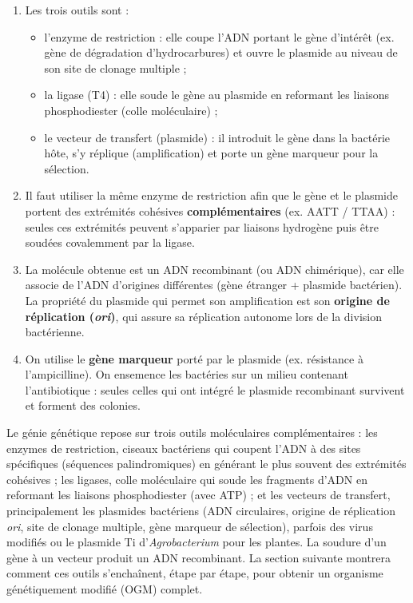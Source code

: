\documentclass[11pt]{article}
\newcommand{\cle}[1]{{\popxbold\color{popdark}#1}}
\begin{document}
\begin{corrige}[Exercice]
\begin{enumerate}
\item Les trois outils sont : 
      \begin{itemize}
      \item l'\cle{enzyme de restriction} : elle coupe l'ADN portant le gène d'intérêt (ex. gène de dégradation d'hydrocarbures) et ouvre le plasmide au niveau de son site de clonage multiple ;
      \item la \cle{ligase} (T4) : elle soude le gène au plasmide en reformant les liaisons phosphodiester (colle moléculaire) ;
      \item le \cle{vecteur de transfert} (plasmide) : il introduit le gène dans la bactérie hôte, s'y réplique (amplification) et porte un gène marqueur pour la sélection.
      \end{itemize}
\item Il faut utiliser la même enzyme de restriction afin que le gène et le plasmide portent des extrémités cohésives \textbf{complémentaires} (ex. AATT / TTAA) : seules ces extrémités peuvent s'apparier par liaisons hydrogène puis être soudées covalemment par la ligase.
\item La molécule obtenue est un \cle{ADN recombinant} (ou ADN chimérique), car elle associe de l'ADN d'origines différentes (gène étranger + plasmide bactérien). La propriété du plasmide qui permet son amplification est son \textbf{origine de réplication (\emph{ori})}, qui assure sa réplication autonome lors de la division bactérienne.
\item On utilise le \textbf{gène marqueur} porté par le plasmide (ex. résistance à l'ampicilline). On ensemence les bactéries sur un milieu contenant l'antibiotique : seules celles qui ont intégré le plasmide recombinant survivent et forment des colonies.
\end{enumerate}
\end{corrige}

\begin{aretenir}
Le génie génétique repose sur trois outils moléculaires complémentaires : les \cle{enzymes de restriction}, ciseaux bactériens qui coupent l'ADN à des sites spécifiques (séquences palindromiques) en générant le plus souvent des extrémités cohésives ; les \cle{ligases}, colle moléculaire qui soude les fragments d'ADN en reformant les liaisons phosphodiester (avec ATP) ; et les \cle{vecteurs de transfert}, principalement les plasmides bactériens (ADN circulaires, origine de réplication \emph{ori}, site de clonage multiple, gène marqueur de sélection), parfois des virus modifiés ou le plasmide Ti d'\emph{Agrobacterium} pour les plantes. La soudure d'un gène à un vecteur produit un \cle{ADN recombinant}. La section suivante montrera comment ces outils s'enchaînent, étape par étape, pour obtenir un organisme génétiquement modifié (OGM) complet.
\end{aretenir}
\end{document}
